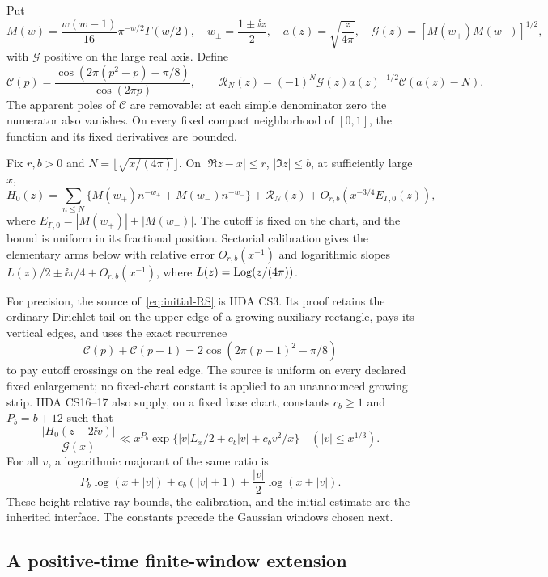 Put
\[
 M(w)=\frac{w(w-1)}{16}\pi^{-w/2}\Gamma(w/2),\quad
 w_\pm=\frac{1\pm\ii z}{2},\quad
 a(z)=\sqrt{\frac z{4\pi}},\quad
 \mathcal G(z)=[M(w_+)M(w_-)]^{1/2},
\]
with $\mathcal G$ positive on the large real axis. Define
\[
 \mathcal C(p)=\frac{\cos(2\pi(p^2-p)-\pi/8)}{\cos(2\pi p)},\qquad
 \mathcal R_N(z)=(-1)^N\mathcal G(z)a(z)^{-1/2}\mathcal C(a(z)-N).
\]
The apparent poles of $\mathcal C$ are removable: at each simple
denominator zero the numerator also vanishes. On every fixed compact
neighborhood of $[0,1]$, the function and its fixed derivatives are
bounded.

\begin{proposition}\label{prop:initial-input}
Fix $r,b>0$ and $N=\lfloor\sqrt{x/(4\pi)}\rfloor$.
On $|\Re z-x|\le r$, $|\Im z|\le b$, at sufficiently large $x$,
\begin{equation}\label{eq:initial-RS}
 H_0(z)=\sum_{n\le N}\{M(w_+)n^{-w_+}+M(w_-)n^{-w_-}\}
       +\mathcal R_N(z)+O_{r,b}(x^{-3/4}E_{\Gamma,0}(z)),
\end{equation}
where $E_{\Gamma,0}=|M(w_+)|+|M(w_-)|$.
The cutoff is fixed on the chart, and the bound is uniform in its
fractional position. Sectorial calibration gives the elementary arms
below with relative error $O_{r,b}(x^{-1})$ and logarithmic slopes
$L(z)/2\pm\ii\pi/4+O_{r,b}(x^{-1})$, where
$L(z)=\operatorname{Log}(z/(4\pi))$.
\end{proposition}

For precision, the source of~\eqref{eq:initial-RS} is HDA CS3.
Its proof retains the ordinary Dirichlet tail on the upper edge of
a growing auxiliary rectangle, pays its vertical edges, and uses the
exact recurrence
\[
 \mathcal C(p)+\mathcal C(p-1)
 =2\cos(2\pi(p-1)^2-\pi/8)
\]
to pay cutoff crossings on the real edge. The source is uniform on
every declared fixed enlargement; no fixed-chart constant is applied
to an unannounced growing strip. HDA CS16--17 also supply, on a fixed
base chart, constants $c_b\ge1$ and $P_b=b+12$ such that
\begin{equation}\label{eq:source-ray}
 \frac{|H_0(z-2\ii v)|}{\mathcal G(x)}
 \ll x^{P_b}\exp\{ |v|L_x/2+c_b|v|+c_bv^2/x\}
 \quad (|v|\le x^{1/3}).
\end{equation}
For all $v$, a logarithmic majorant of the same ratio is
\[
 P_b\log(x+|v|)+c_b(|v|+1)+\frac{|v|}{2}\log(x+|v|).
\]
These height-relative ray bounds, the calibration, and the initial
estimate are the inherited interface. The constants precede the
Gaussian windows chosen next.

\subsection{A positive-time finite-window extension}

